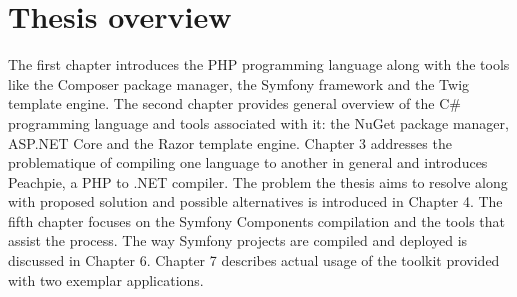 \section*{Thesis overview}

The first chapter introduces the PHP programming language along with the tools like the Composer package manager, the Symfony framework and the Twig template engine. The second chapter provides general overview of the C\# programming language and tools associated with it: the NuGet package manager, ASP.NET Core and the Razor template engine. Chapter 3 addresses the problematique of compiling one language to another in general and introduces Peachpie, a PHP to .NET compiler. The problem the thesis aims to resolve along with proposed solution and possible alternatives is introduced in Chapter 4. The fifth chapter focuses on the Symfony Components compilation and the tools that assist the process. The way Symfony projects are compiled and deployed is discussed in Chapter 6. Chapter 7 describes actual usage of the toolkit provided with two exemplar applications.
